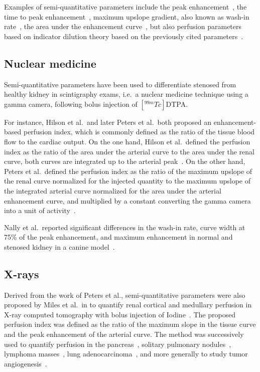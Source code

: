 Examples of semi-quantitative parameters include the peak enhancement~\cite{Norman:1978ji,Nally:1985te,Pettersson:1987ft,Erlemann:1989ib}, the time to peak enhancement~\cite{Norman:1978ji,Erlemann:1989ib,Dietrich:2012kw}, maximum upslope gradient, also known as wash-in rate~\cite{Nally:1985te,Erlemann:1989ib}, the area under the enhancement curve~\cite{Dietrich:2012kw}, but also perfusion parameters based on indicator dilution theory based on the previously cited parameters~\cite{Hilson:1978us,Peters:1987fa,Peters:1987vx,Miles:1991et,Miles:1991ei,Miles:1993cq,Blomley:1995vs,Koenig:1998ir}.

\subsection{Nuclear medicine}
\label{sec:SQNM}
Semi-quantitative parameters have been used to differentiate stenosed from healthy kidney in scintigraphy exams, i.e.~a nuclear medicine technique using a gamma camera, following bolus injection of $\left[^{99m}Tc\right]$DTPA.

For instance, Hilson et al.~and later Peters et al.~both proposed an enhancement-based perfusion index, which is commonly defined as the ratio of the tissue blood flow to the cardiac output. 
On the one hand, Hilson et al.~defined the perfusion index as the ratio of the area under the arterial curve to the area under the renal curve, both curves are integrated up to the arterial peak~\cite{Hilson:1978us}.
On the other hand, Peters et al.~defined the perfusion index as the ratio of the maximum upslope of the renal curve normalized for the injected quantity to the maximum upslope of the integrated arterial curve normalized for the area under the arterial enhancement curve, and multiplied by a constant converting the gamma camera into a unit of activity~\cite{Peters:1987fa,Peters:1987vx}. 

Nally et al.~reported significant differences in the wash-in rate, curve width at 75\% of the peak enhancement, and maximum enhancement in normal and stenosed kidney in a canine model~\cite{Nally:1985te}. 


\subsection{X-rays}
\label{sec:SQRadiography}
Derived from the work of Peters et al., semi-quantitative parameters were also proposed by Miles et al.~in \citeyear{Miles:1991et} to quantify renal cortical and medullary perfusion in X-ray computed tomography with bolus injection of Iodine~\cite{Miles:1991et,Miles:1991ei}. 
The proposed perfusion index was defined as the ratio of the maximum slope in the tissue curve and the peak enhancement of the arterial curve. 
The method was successively used to quantify perfusion in the pancreas~\cite{Miles:2014ea}, solitary pulmonary nodules~\cite{Zhang:1997bi}, lymphoma masses~\cite{Dugdale:1999co}, lung adenocarcinoma~\cite{Tateishi:2001fz}, and more generally to study tumor angiogenesis~\cite{Tateishi:2001fz,Miles:2002eu}.

